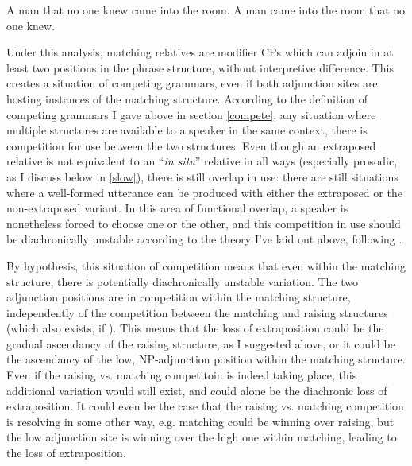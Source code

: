 
\begin{exe}
    \ex \begin{xlist}
         \ex \label{crinsitu} A man that no one knew came into the room.
         \ex \label{crex} A man came into the room that no one knew.
         \end{xlist}
         \citep[][23]{culicoverrochemont1990}
\end{exe}

Under this analysis, matching relatives are modifier CPs which can adjoin in at least two positions in the phrase structure, without interpretive difference. This creates a situation of competing grammars, even if both adjunction sites are hosting instances of the matching structure. According to the definition of competing grammars I gave above in section \ref{compete}, any situation where multiple structures are available to a speaker in the same context, there is competition for use between the two structures. Even though an extraposed relative is not equivalent to an ``\textsl{in situ}'' relative in all ways (especially prosodic, as I discuss below in \ref{slow}), there is still overlap in use: there are still situations where a well-formed utterance can be produced with either the extraposed or the non-extraposed variant. In this area of functional overlap, a speaker is nonetheless forced to choose one or the other, and this competition in use should be diachronically unstable according to the theory I've laid out above, following \citet{kroch1994}.

By hypothesis, this situation of competition means that even within the matching structure, there is potentially diachronically unstable variation. The two adjunction positions are in competition within the matching structure, independently of the competition between the matching and raising structures (which also exists, if \citealt{sauerland2003} ). This means that the loss of extraposition could be the gradual ascendancy of the raising structure, as I suggested above, or it could be the ascendancy of the low, NP-adjunction position within the matching structure. Even if the raising vs. matching competitoin is indeed taking place, this additional variation would still exist, and could alone be the diachronic loss of extraposition. It could even be the case that the raising vs. matching competition is resolving in some other way, e.g. matching could be winning over raising, but the low adjunction site is winning over the high one within matching, leading to the loss of extraposition.

